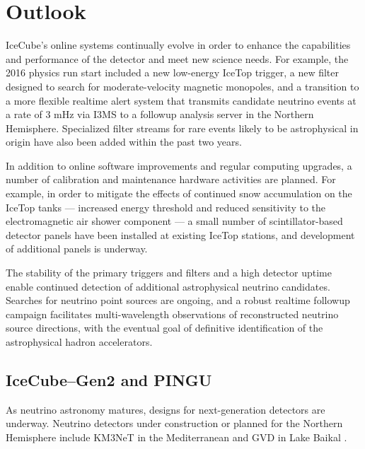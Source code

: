 \section{Outlook}

IceCube's online systems continually evolve in order to enhance the
capabilities and performance of the detector and meet new science needs.  
For example, the 2016 physics run start
included a new low-energy IceTop trigger, a new filter designed to search for
moderate-velocity magnetic monopoles, and a transition to a more flexible
realtime alert system that transmits candidate neutrino events at a rate of
3 mHz via I3MS to a followup analysis server in the Northern Hemisphere.
Specialized filter streams for rare events likely to be astrophysical in
origin have also been added within the past two years.  

In addition to online software improvements and regular computing upgrades, a
number of calibration and maintenance hardware activities are 
planned. For example, in order to mitigate the effects of continued snow
accumulation on the IceTop tanks --- increased energy threshold and reduced
sensitivity to the electromagnetic air shower component --- a small number
of scintillator-based  detector panels have been installed at existing
IceTop stations, and development of additional panels is underway.

The stability of the primary triggers and filters and a high detector
uptime enable continued detection of additional astrophysical neutrino
candidates.  Searches for neutrino point sources are ongoing, and a robust
realtime followup campaign facilitates multi-wavelength observations of
reconstructed neutrino source directions, with the eventual goal of
definitive identification of the astrophysical hadron accelerators.

\subsection{IceCube--Gen2 and PINGU}

As neutrino astronomy matures, designs for next-generation detectors are underway.   Neutrino
detectors under construction or planned for the Northern Hemisphere include
KM3NeT in the Mediterranean \cite{km3net} and GVD in Lake Baikal \cite{gvd}.  

